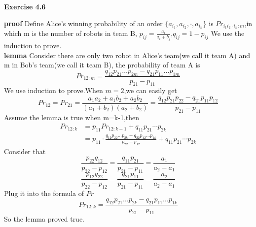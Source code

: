 \documentclass{article} %
\begin{document}
   \textbf{Exercise 4.6}\par
	\textbf{proof} Define Alice's winning probability of an order $\{a_{i_1},a_{i_2},\cdot,a_{i_n}\}$ is $Pr_{i_1i_2 \cdot i_n:m}$,in which m is the number of robots in team B, $p_{ij}=\frac{a_i}{a_i+b_j}$,$q_{ij}=1-p_{ij}$  We use the induction to prove.\\

    \textbf{lemma} Consider there are only two robot in Alice's team(we call it team A) and m in Bob's team(we call it team B), the probability of team A is
    \begin{equation}
     Pr_{12:m}=\frac{q_{12}p_{21}\dots p_{2m}-q_{21}p_{11}\dots p_{1m}}{p_{21}-p_{11}}
    \end{equation}
    We use induction to prove.When $m=2$,we can easily get
    \begin{equation}
    Pr_{12}=Pr_{21}=\frac{a_1a_2+a_1b_2+a_2b_2}{(a_1+b_2)(a_2+b_2)}=\frac{q_{12}p_{21}p_{22}-q_{21}p_{11}p_{12}}{p_{21}-p_{11}}
    \end{equation}
    Assume the lemma is true when m=k-1,then
    \begin{equation}
    \begin{aligned}
    Pr_{12:k}&=p_{11}Pr_{12:k-1}+q_{11}p_{21}\cdots p_{2k}\\
    		 &=p_{11}\cdot \frac{q_{12}p_{22}\dots p_{2k}-q
    		 	_{22}p_{12}\dots p_{1k}}{p_{22}-p_{12}}+q_{11}p_{21}\cdots p_{2k}
    \end{aligned}
    \end{equation}
    Consider that
    $$
    \frac{p_{22}q_{12}}{p_{22}-p_{12}}=\frac{q_{11}p_{21}}{p_{21}-p_{11}}=\frac{a_1}{a_2-a_1}
    $$
    $$
    \frac{p_{12}q_{22}}{p_{22}-p_{12}}=\frac{q_{21}p_{11}}{p_{21}-p_{11}}=\frac{a_2}{a_2-a_1}
    $$
    Plug it into the formula of $Pr$
    $$
    Pr_{12:k}=\frac{q_{12}p_{21}\dots p_{2k}-q_{21}p_{11}\dots p_{1k}}{p_{21}-p_{11}}
    $$
    So the lemma proved true.\\
\end{document}

